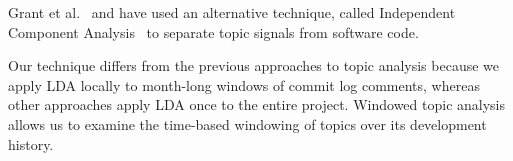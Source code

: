 \documentclass[times, 10pt,twocolumn]{article}
\begin{document}
Grant et al.~\cite{scottcordy} and have used an alternative technique,
called Independent Component Analysis~\cite{delacshort} to separate topic signals from
software code.

Our technique differs from the previous approaches to topic analysis because we apply
LDA locally to month-long windows of commit log comments, whereas
other approaches apply LDA once to the entire project. Windowed topic
analysis allows us to examine the time-based windowing of topics over
its development history.


\end{document}
